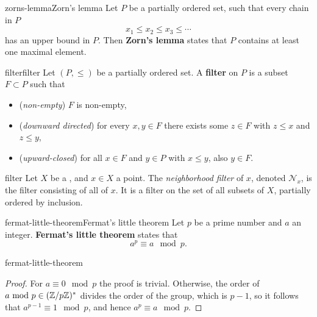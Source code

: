 \begin{topic}{zorns-lemma}{Zorn's lemma}
    Let $P$ be a partially ordered set, such that every chain in $P$
    \[ x_1 \le x_2 \le x_3 \le \cdots \]
    has an upper bound in $P$. Then \textbf{Zorn's lemma} states that $P$ contains at least one maximal element.
\end{topic}

\begin{topic}{filter}{filter}
    Let $(P, \le)$ be a partially ordered set. A \textbf{filter} on $P$ is a subset $F \subset P$ such that
    \begin{itemize}
        \item (\textit{non-empty}) $F$ is non-empty,
        \item (\textit{downward directed}) for every $x, y \in F$ there exists some $z \in F$ with $z \le x$ and $z \le y$,
        \item (\textit{upward-closed}) for all $x \in F$ and $y \in P$ with $x \le y$, also $y \in F$.
    \end{itemize}
\end{topic}

\begin{example}{filter}
    Let $X$ be a , and $x \in X$ a point. The \textit{neighborhood filter} of $x$, denoted $\mathcal{N}_x$, is the filter consisting of all  of $x$. It is a filter on the set of all subsets of $X$, partially ordered by inclusion.
\end{example}

\begin{topic}{fermat-little-theorem}{Fermat's little theorem}
    Let $p$ be a prime number and $a$ an integer. \textbf{Fermat's little theorem} states that
    \[ a^p \equiv a \mod p . \]
\end{topic}

\begin{example}{fermat-little-theorem}
    \begin{proof}
        For $a \equiv 0 \mod p$ the proof is trivial. Otherwise, the order of $a \textup{ mod } p \in (\mathbb{Z}/p\mathbb{Z})^*$ divides the order of the group, which is $p - 1$, so it follows that $a^{p - 1} \equiv 1 \mod p$, and hence $a^p \equiv a \mod p$.
    \end{proof}
\end{example}
